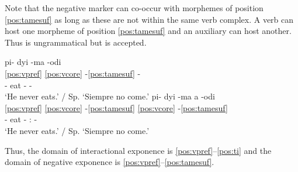 \documentclass[output=paper,hidelinks]{langscibook}
\begin{document}
Note that the negative marker can co-occur with morphemes of position \ref{pos:tamesuf} as long as these are not within the same verb complex. A verb can host one morpheme of position \ref{pos:tamesuf} and an auxiliary can host another. Thus  is ungrammatical but  is accepted.

\ea 
 \ea\label{ex:pidyimaodi}{
    \glll *pi- dyi -ma -odi \\
    \ref{pos:vpref} \ref{pos:vcore} -\ref{pos:tamesuf} -  \\
    \Neg{}- eat -\Neg{} -\Freq{} \\
    \glt `He never eats.' / Sp. `Siempre no come.'}
 \ex \label{ex:pidyimaaodi}{
    \glll pi- dyi -ma a -odi \\
    \ref{pos:vpref} \ref{pos:vcore} -\ref{pos:tamesuf}
    \ref{pos:vcore} -\ref{pos:tamesuf}  \\
    \Neg{}- eat -\Neg{} \Aux{}:\Tr{} -\Freq{} \\
    \glt `He never eats.' / Sp. `Siempre no come.'}
 \z
\z

Thus, the domain of interactional exponence is \ref{pos:vpref}--\ref{pos:ti} and the domain of negative exponence is \ref{pos:vpref}--\ref{pos:tamesuf}.


\end{document}
